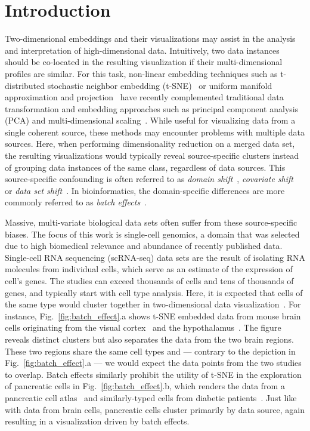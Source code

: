 \documentclass[runningheads]{llncs}
\begin{document}
\section{Introduction}
\label{sec:intro}

Two-dimensional embeddings and their visualizations may assist in the analysis
and interpretation of high-dimensional data. Intuitively, two data instances
should be co-located in the resulting visualization if their multi-dimensional
profiles are similar. For this task, non-linear embedding techniques such as
t\nobreakdash -distributed stochastic neighbor embedding (t-SNE)~\cite{Maaten2008} or
uniform manifold approximation and projection~\cite{McInnes2018} have recently
complemented traditional data transformation and embedding approaches such as
principal component analysis (PCA) and multi-dimensional
scaling~\cite{distill,umap_single_cell}. While useful for visualizing data from
a single coherent source, these methods may encounter problems with multiple
data sources. Here, when performing dimensionality reduction on a merged data
set, the resulting visualizations would typically reveal source-specific
clusters instead of grouping data instances of the same class, regardless of
data sources. This source-specific confounding is often referred to as {\em
domain shift}~\cite{domain_shift}, {\em covariate shift}~\cite{covariate_shift}
or {\em data set shift}~\cite{dataset_shift}. In bioinformatics, the
domain-specific differences are more commonly referred to as {\em batch
effects}~\cite{Butler2018,Haghverdi2018,Stuart2019}.

Massive, multi-variate biological data sets often suffer from these
source-specific biases.  The focus of this work is single-cell genomics, a
domain that was selected due to high biomedical relevance and abundance of
recently published data. Single-cell RNA sequencing (scRNA-seq) data sets are
the result of isolating RNA molecules from individual cells, which serve as an
estimate of the expression of cell's genes.  The studies can exceed thousands
of cells and tens of thousands of genes, and typically start with cell type
analysis. Here, it is expected that cells of the same type would cluster
together in two-dimensional data visualization~\cite{Wolf2018}. For instance,
Fig.~\ref{fig:batch_effect}.a shows t-SNE embedded data from mouse brain cells
originating from the visual cortex~\cite{Hrvatin2018} and the
hypothalamus~\cite{Chen2017}. The figure reveals distinct clusters but also
separates the data from the two brain regions. These two regions share the same
cell types and --- contrary to the depiction in Fig.~\ref{fig:batch_effect}.a
--- we would expect the data points from the two studies to overlap. Batch
effects similarly prohibit the utility of t-SNE in the exploration of
pancreatic cells in Fig.~\ref{fig:batch_effect}.b, which renders the data from
a pancreatic cell atlas~\cite{Baron2016} and similarly-typed cells from
diabetic patients~\cite{Xin2016}. Just like with data from brain cells,
pancreatic cells cluster primarily by data source, again resulting in a
visualization driven by batch effects.
\end{document}
